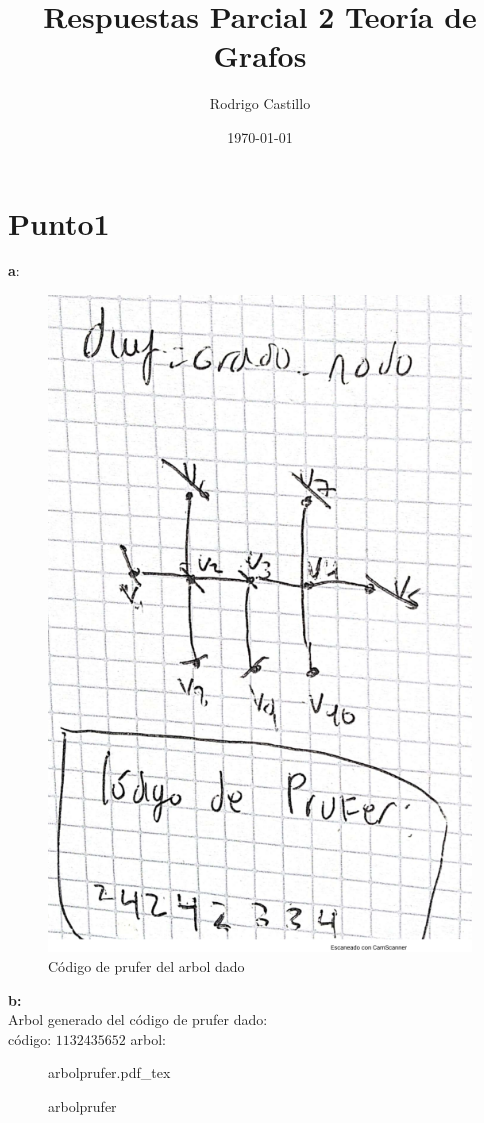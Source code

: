 \documentclass[10pt,a4paper]{article} %
\newcommand{\incfig}[1]{%
    \def\svgwidth{\columnwidth}
    {#1.pdf_tex}
}
\begin{document}
    \title{{  Respuestas Parcial 2 Teoría de Grafos  }}
    \author{{Rodrigo Castillo}}
    \date{\today}

    \maketitle


    \newpage
    \section{Punto1}
    \textbf{a}:
    \\
    \begin{figure}[h!]
        \centering
        \includegraphics[width=0.4\linewidth]{prufer.png}
        \caption{Código de prufer del arbol dado}
        \label{fig}
    \end{figure}
    \textbf{b:}
    \\
    Arbol generado del código de prufer dado:
    \\
    código: $1132435652$
    arbol:
    \\
\begin{figure}[ht]
    \centering
    \incfig{arbolprufer}
    \caption{arbolprufer}
    \label{fig:arbolprufer}
\end{figure}






    \newpage
\end{document}
